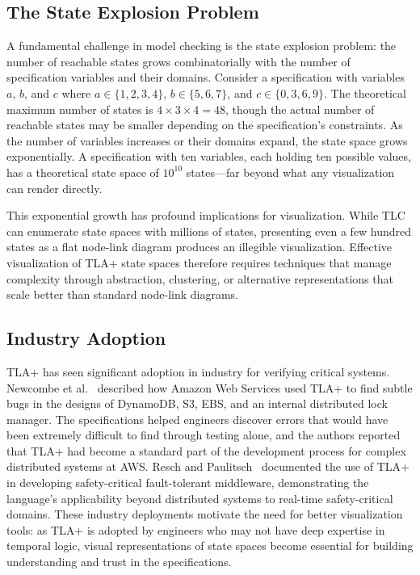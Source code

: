 \documentclass[conference]{IEEEtran}
\begin{document}
\subsection{The State Explosion Problem}

A fundamental challenge in model checking is the state explosion problem: the number of reachable states grows combinatorially with the number of specification variables and their domains. Consider a specification with variables $a$, $b$, and $c$ where $a \in \{1, 2, 3, 4\}$, $b \in \{5, 6, 7\}$, and $c \in \{0, 3, 6, 9\}$. The theoretical maximum number of states is $4 \times 3 \times 4 = 48$, though the actual number of reachable states may be smaller depending on the specification's constraints. As the number of variables increases or their domains expand, the state space grows exponentially. A specification with ten variables, each holding ten possible values, has a theoretical state space of $10^{10}$ states---far beyond what any visualization can render directly.

This exponential growth has profound implications for visualization. While TLC can enumerate state spaces with millions of states, presenting even a few hundred states as a flat node-link diagram produces an illegible visualization. Effective visualization of TLA+ state spaces therefore requires techniques that manage complexity through abstraction, clustering, or alternative representations that scale better than standard node-link diagrams.

\subsection{Industry Adoption}

TLA+ has seen significant adoption in industry for verifying critical systems. Newcombe et al.~\cite{newcombe2015amazon} described how Amazon Web Services used TLA+ to find subtle bugs in the designs of DynamoDB, S3, EBS, and an internal distributed lock manager. The specifications helped engineers discover errors that would have been extremely difficult to find through testing alone, and the authors reported that TLA+ had become a standard part of the development process for complex distributed systems at AWS. Resch and Paulitsch~\cite{resch2017tla} documented the use of TLA+ in developing safety-critical fault-tolerant middleware, demonstrating the language's applicability beyond distributed systems to real-time safety-critical domains. These industry deployments motivate the need for better visualization tools: as TLA+ is adopted by engineers who may not have deep expertise in temporal logic, visual representations of state spaces become essential for building understanding and trust in the specifications.
\end{document}
